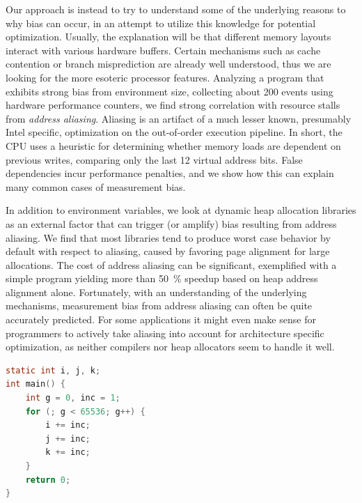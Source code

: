 \documentclass[a4paper,10pt,twocolumn,twoside]{article}
\begin{document}
Our approach is instead to try to understand some of the underlying reasons to why bias can occur, in an attempt to utilize this knowledge for potential optimization. %
Usually, the explanation will be that different memory layouts interact with various hardware buffers.
Certain mechanisms such as cache contention or branch misprediction are already well understood, thus we are looking for the more esoteric processor features.
Analyzing a program that exhibits strong bias from environment size, collecting about 200 events using hardware performance counters, we find strong correlation with resource stalls from \emph{address aliasing}.
Aliasing is an artifact of a much lesser known, presumably Intel specific, optimization on the out-of-order execution pipeline.
In short, the CPU uses a heuristic for determining whether memory loads are dependent on previous writes, comparing only the last 12 virtual address bits.
False dependencies incur performance penalties, and we show how this can explain many common cases of measurement bias.

In addition to environment variables, we look at dynamic heap allocation libraries as an external factor that can trigger (or amplify) bias resulting from address aliasing.
We find that most libraries tend to produce worst case behavior by default with respect to aliasing, caused by favoring page alignment for large allocations.
The cost of address aliasing can be significant, exemplified with a simple program yielding more than 50~\% speedup based on heap address alignment alone.
Fortunately, with an understanding of the underlying mechanisms, measurement bias from address aliasing can often be quite accurately predicted.
For some applications it might even make sense for programmers to actively take aliasing into account for architecture specific optimization, as neither compilers nor heap allocators seem to handle it well.

\begin{lstlisting}[float=t, language=C, caption={Micro-kernel succeptible to aliasing between static and automatic variables depending on environment sizes}, label={lst:loopkernel}, frame=lines]
static int i, j, k;
int main() {
    int g = 0, inc = 1;
    for (; g < 65536; g++) {
        i += inc;
        j += inc;
        k += inc; 
    }
    return 0;
}
\end{lstlisting}
\end{document}
